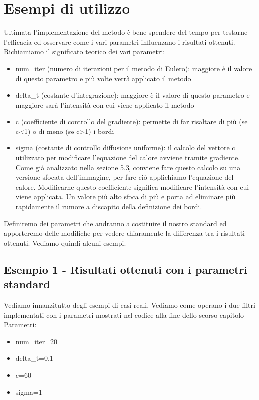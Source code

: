 \section{Esempi di utilizzo}
Ultimata l'implementazione del metodo è bene spendere del tempo per testarne l'efficacia ed osservare come i vari parametri influenzano i risultati ottenuti.\\
Richiamiamo il significato teorico dei vari parametri:
\begin{itemize}
    \item num\_iter (numero di iterazioni per il metodo di Eulero): maggiore è il valore di questo parametro e più volte verrà applicato il metodo
    \item delta\_t (costante d'integrazione): maggiore è il valore di questo parametro e maggiore sarà l'intensità con cui viene applicato il metodo\\
    \item c (coefficiente di controllo del gradiente): permette di far risaltare di più (se c<1) o di meno (se c>1) i bordi
    \item sigma (costante di controllo diffusione uniforme): il calcolo del vettore c utilizzato per modificare l'equazione del calore avviene tramite gradiente. Come già analizzato nella sezione 5.3, conviene fare questo calcolo su una versione sfocata dell'immagine, per fare ciò applichiamo l'equazione del calore. Modificarne questo coefficiente significa modificare l'intensità con cui viene applicata. Un valore più alto sfoca di più e porta ad eliminare più rapidamente il rumore a discapito della definizione dei bordi.
\end{itemize}
Definiremo dei parametri che andranno a costituire il nostro standard ed apporteremo delle modifiche per vedere chiaramente la differenza tra i risultati ottenuti.
Vediamo quindi alcuni esempi.

\newpage
\subsection{Esempio 1 - Risultati ottenuti con i parametri standard}
Vediamo innanzitutto degli esempi di casi reali, Vediamo come operano i due filtri implementati con i parametri mostrati nel codice alla fine dello scorso capitolo\\
Parametri:
\begin{itemize}
    \item num\_iter=20
    \item delta\_t=0.1
    \item c=60
    \item sigma=1
\end{itemize}

